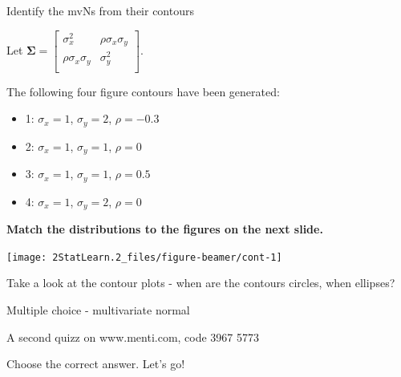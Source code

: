 \documentclass[
  ignorenonframetext,
]{beamer}
\providecommand{\tightlist}{%
  \setlength{\itemsep}{0pt}\setlength{\parskip}{0pt}}
\begin{document}
\begin{frame}
\begin{block}{Identify the mvNs from their contours}
\protect\hypertarget{identify-the-mvns-from-their-contours}{}
\vspace{4mm}

Let
\(\boldsymbol\Sigma=\left[\begin{array}{cc} \sigma_x^2 & \rho\sigma_{x}\sigma_{y}\\\rho\sigma_{x}\sigma_{y}&\sigma_y^2\\ \end{array} \right]\).

\vspace{4mm}

The following four figure contours have been generated:

\begin{itemize}
\tightlist
\item
  1: \(\sigma_x=1\), \(\sigma_y=2\), \(\rho=-0.3\)
\item
  2: \(\sigma_x=1\), \(\sigma_y=1\), \(\rho=0\)
\item
  3: \(\sigma_x=1\), \(\sigma_y=1\), \(\rho=0.5\)
\item
  4: \(\sigma_x=1\), \(\sigma_y=2\), \(\rho=0\)
\end{itemize}

\vspace{8mm}

\textbf{Match the distributions to the figures on the next slide.}
\end{block}
\end{frame}

\begin{frame}
\begin{center}\texttt{[image: 2StatLearn.2\_files/figure-beamer/cont-1]} \end{center}

Take a look at the contour plots - when are the contours circles, when
ellipses?
\end{frame}

\begin{frame}
\begin{block}{Multiple choice - multivariate normal}
\protect\hypertarget{multiple-choice---multivariate-normal}{}
\vspace{2mm}

A second quizz on www.menti.com, code 3967 5773

Choose the correct answer. Let's go!
\end{block}
\end{frame}
\end{document}
